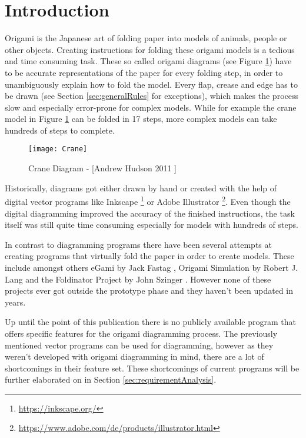 
\section{Introduction}
\label{sec:introduction}

Origami is the Japanese art of folding paper into models of animals, people or other objects. Creating instructions for folding these \gls{origami} models is a tedious and time consuming task. These so called origami diagrams (see Figure \ref{fig:craneDiagram}) have to be accurate representations of the paper for every folding step, in order to unambiguously explain how to fold the model. Every flap, crease and edge has to be drawn (see Section \ref{sec:generalRules} for exceptions), which makes the process slow and especially error-prone for complex models. While for example the crane model in Figure \ref{fig:craneDiagram} can be folded in 17 steps, more complex models can take hundreds of steps to complete.
\begin{figure}[htbp]
	\centering
	\texttt{[image: Crane]}
	\caption[Crane Diagram]{Crane Diagram - [Andrew Hudson 2011 \cite{Hudson}]}
	\label{fig:craneDiagram}
\end{figure}

Historically, diagrams got either drawn by hand or created with the help of digital vector programs like Inkscape \footnote{\url{https://inkscape.org/}} or Adobe Illustrator \footnote{\url{https://www.adobe.com/de/products/illustrator.html}}. Even though the digital diagramming improved the accuracy of the finished instructions, the task itself was still quite time consuming especially for models with hundreds of steps.

In contrast to diagramming programs there have been several attempts at creating programs that virtually fold the paper in order to create models. These include amongst others eGami by Jack Fastag \cite{eGami}, Origami Simulation by Robert J. Lang \cite{origamiSimulation} and the Foldinator Project by John Szinger \cite{foldinator}. However none of these projects ever got outside the prototype phase and they haven't been updated in years.

Up until the point of this publication there is no publicly available program that offers specific features for the origami diagramming process.  The previously mentioned vector programs can be used for diagramming, however as they weren't developed with origami diagramming in mind, there are a lot of shortcomings in their feature set. These shortcomings of current programs will be further elaborated on in Section \ref{sec:requirementAnalysis}.

